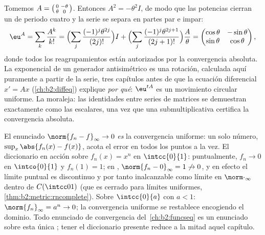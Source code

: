 \begin{example}\label{ex:b2:nvs:rotationexp}
Tomemos $A = \begin{psmallmatrix}0 & -\theta\\ \theta &
0\end{psmallmatrix}$. Entonces $A^2 = -\theta^2 I$, de modo que las
potencias cierran un  de periodo cuatro y la serie se separa
en partes par e impar:
\[
\eu^{A} = \sum_{k}\frac{A^k}{k!}
= \Bigl(\sum_{j}\frac{(-1)^j\theta^{2j}}{(2j)!}\Bigr) I
+ \Bigl(\sum_{j}\frac{(-1)^j\theta^{2j+1}}{(2j+1)!}\Bigr)
\frac{A}{\theta}
= \begin{pmatrix}
\cos\theta & -\sin\theta\\
\sin\theta & \cos\theta
\end{pmatrix},
\]
donde todos los reagrupamientos están autorizados por la
convergencia absoluta. La exponencial de un generador antisimétrico
es una rotación, calculada aquí puramente a partir de la serie,
tres capítulos antes de que la ecuación diferencial $x' = Ax$
(\cref{ch:b2:diffeq}) explique \emph{por qué}: $\eu^{tA}$ es un
movimiento circular uniforme. La moraleja: las identidades entre
series de matrices se demuestran exactamente como las escalares,
una vez que una  submultiplicativa certifica la convergencia
absoluta.
\end{example}

\begin{example}\label{ex:b2:nvs:uniformdictionary}
El enunciado $\norm{f_n - f}_\infty \to 0$ \emph{es} la
convergencia uniforme: un solo número, $\sup_x\abs{f_n(x) -
f(x)}$, acota el error en todos los puntos a la vez. El
diccionario en acción sobre $f_n(x) = x^n$ en $\intcc{0}{1}$:
puntualmente, $f_n \to 0$ en $\intco{0}{1}$ y $f_n(1) = 1$; en
, $\norm{f_n - 0}_\infty = 1 \not\to 0$, y en efecto el
límite puntual es discontinuo y por tanto inalcanzable como límite
en $\norm\cdot_\infty$ dentro de $C(\intcc01)$ (que es cerrado
para límites uniformes, \cref{thm:b2:metric:rncomplete}). Sobre
$\intcc{0}{a}$ con $a < 1$: $\norm{f_n}_\infty = a^n \to 0$; la
convergencia uniforme se restablece encogiendo el dominio. Todo
enunciado de convergencia del~\cref{ch:b2:funcseq} es un enunciado
sobre esta única ; tener el diccionario presente reduce a la
mitad aquel capítulo.
\end{example}

